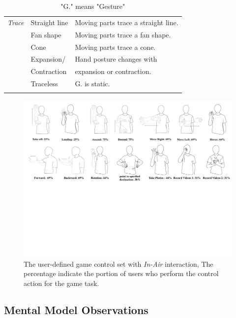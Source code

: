 \documentclass{sigchi}
\begin{document}
\begin{table}
\begin{adjustwidth}{-0.4cm}{}
\begin{tabular}{|l|l|l|}
    \Xhline{4\arrayrulewidth}
    \em{Trace}&Straight line&Moving parts trace a straight line.\\ \cline{2-3}
    &Fan shape&Moving parts trace a fan shape.\\ \cline{2-3}
    &Cone&Moving parts trace a cone.\\ \cline{2-3}
    &Expansion/&Hand posture changes with \\&Contraction&expansion or contraction.\\
     \cline{2-3}
    &Traceless&G. is static.\\
    \Xhline{4\arrayrulewidth}
  \end{tabular}
  \caption{"G." means "Gesture"}
  \label{tab:table1}
  \end{adjustwidth}
\end{table}

\begin{figure}
  \centering
  \includegraphics[width=1\textwidth]{GestureSetFigure1.pdf}
  \caption{The user-defined game control set with \emph{In-Air} interaction, The percentage indicate the portion of users who perform the control action for the game task.}
  \label{fig:GestureSetFigure}
  \end{figure}

\subsection{Mental Model Observations}
\end{document}
